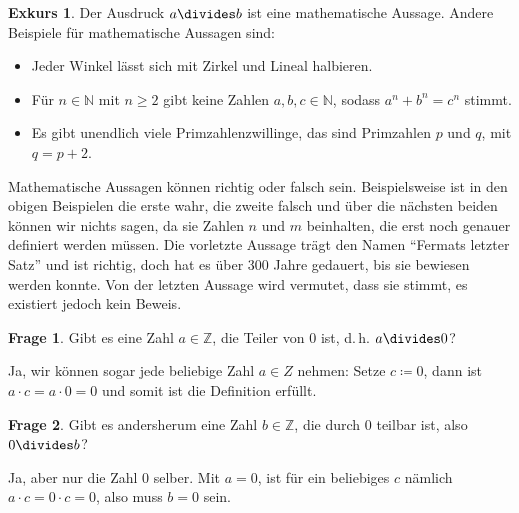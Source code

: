 \documentclass[a4paper,ngerman,12pt]{scrartcl}
\newcommand{\N}{\mathbb{N}}
\newcommand{\Z}{\mathbb{Z}}
\theoremstyle{definition}
\newtheorem*{frage}{Frage}
\newtheorem*{exk}{Exkurs}
\newenvironment{exkurs}{\begin{shaded}\begin{exk}}{\end{exk}\end{shaded}}
\begin{document}
\begin{exkurs}
  Der Ausdruck $a \divides b$ ist eine mathematische Aussage. Andere Beispiele für mathematische Aussagen sind:
  \begin{itemize}
    \item Jeder Winkel lässt sich mit Zirkel und Lineal halbieren.
    \item Für $n \in \N$ mit $n \geq 2$ gibt keine Zahlen $a, b, c \in \N$, sodass $a^n + b^n = c^n$ stimmt.
    \item Es gibt unendlich viele Primzahlenzwillinge, das sind Primzahlen $p$ und $q$, mit $q = p + 2$.
  \end{itemize}

  Mathematische Aussagen können richtig oder falsch sein. Beispielsweise ist in den obigen Beispielen die erste wahr, die zweite falsch und über die nächsten beiden können wir nichts sagen, da sie Zahlen $n$ und $m$ beinhalten, die erst noch genauer definiert werden müssen. Die vorletzte Aussage trägt den Namen "`Fermats letzter Satz"' und ist richtig, doch hat es über 300 Jahre gedauert, bis sie bewiesen werden konnte. Von der letzten Aussage wird vermutet, dass sie stimmt, es existiert jedoch kein Beweis.
\end{exkurs}

\begin{frage}
  Gibt es eine Zahl $a \in \Z$, die Teiler von $0$ ist, d.\,h. $a \divides 0$?
\end{frage}

\begin{antw}
  Ja, wir können sogar jede beliebige Zahl $a \in Z$ nehmen: Setze $c \coloneqq 0$, dann ist $a \cdot c = a \cdot 0 = 0$ und somit ist die Definition erfüllt.
\end{antw}

\begin{frage}
  Gibt es andersherum eine Zahl $b \in \Z$, die durch $0$ teilbar ist, also $0 \divides b$?
\end{frage}

\begin{antw}
  Ja, aber nur die Zahl $0$ selber. Mit $a = 0$, ist für ein beliebiges $c$ nämlich $a \cdot c = 0 \cdot c = 0$, also muss $b = 0$ sein.
\end{antw}
\end{document}
